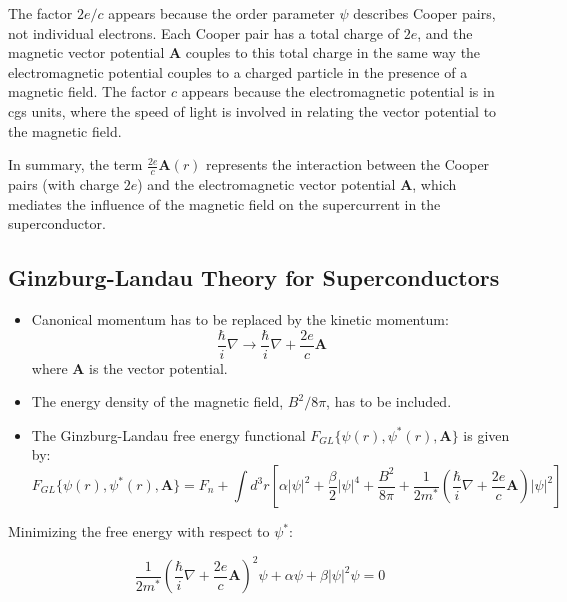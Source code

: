 \documentclass{article}
\begin{document}
\begin{theorem}
The factor \(2e/c\) appears because the order parameter \(\psi\) describes Cooper pairs, not individual electrons. Each Cooper pair has a total charge of \(2e\), and the magnetic vector potential \(\mathbf{A}\) couples to this total charge in the same way the electromagnetic potential couples to a charged particle in the presence of a magnetic field. The factor \(c\) appears because the electromagnetic potential is in cgs units, where the speed of light is involved in relating the vector potential to the magnetic field.

In summary, the term \(\frac{2e}{c} \mathbf{A}(r)\) represents the interaction between the Cooper pairs (with charge \(2e\)) and the electromagnetic vector potential \(\mathbf{A}\), which mediates the influence of the magnetic field on the supercurrent in the superconductor.
    
\end{theorem}


\subsection{Ginzburg-Landau Theory for Superconductors}

\begin{itemize}
    \item Canonical momentum has to be replaced by the kinetic momentum:
    \[
    \frac{\hbar}{i} \nabla \rightarrow \frac{\hbar}{i} \nabla + \frac{2e}{c} \mathbf{A}
    \]
    where $\mathbf{A}$ is the vector potential.

    \item The energy density of the magnetic field, $B^2 / 8\pi$, has to be included.

    \item The Ginzburg-Landau free energy functional $F_{GL} \{ \psi(r), \psi^*(r), \mathbf{A} \}$ is given by:
    \begin{equation}
    F_{GL} \{ \psi(r), \psi^*(r), \mathbf{A} \} = F_n + \int d^3r \left[ \alpha |\psi|^2 + \frac{\beta}{2} |\psi|^4 + \frac{B^2}{8\pi} + \frac{1}{2m^*} \left( \frac{\hbar}{i} \nabla + \frac{2e}{c} \mathbf{A} \right) |\psi|^2 \right]
    \end{equation}
\end{itemize}

Minimizing the free energy with respect to $\psi^*$:

\begin{equation}
    \frac{1}{2m^*} \left( \frac{\hbar}{i} \nabla + \frac{2e}{c} \mathbf{A} \right)^2 \psi + \alpha \psi + \beta |\psi|^2 \psi = 0
\end{equation}
\end{document}
